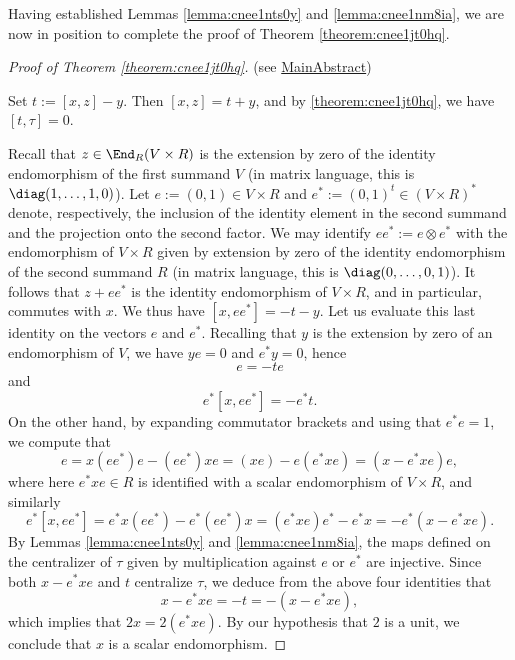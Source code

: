 \documentclass[reqno]{amsart} 
\begin{document}
Having established Lemmas \ref{lemma:cnee1nts0y} and \ref{lemma:cnee1nm8ia}, we are now in position to complete the proof of Theorem \ref{theorem:cnee1jt0hq}.
\begin{proof}[Proof of Theorem \ref{theorem:cnee1jt0hq}]
  (see  \href{MainAbstract.lean}{MainAbstract})
  
  Set $t := [x,z] - y$.  Then $[x,z] = t + y$, and by \ref{theorem:cnee1jt0hq}, we have $[t,\tau] = 0$.

  Recall that $z \in \End_R(V \times R)$ is the extension by zero of the identity endomorphism of the first summand $V$ (in matrix language, this is $\diag(1,\dotsc,1,0)$).  Let $e := (0,1) \in V \times R$ and $e^* := (0,1)^t \in (V \times R)^*$ denote, respectively, the inclusion of the identity element in the second summand and the projection onto the second factor.  We may identify $e e^* := e \otimes e^*$ with the endomorphism of $V \times R$ given by extension by zero of the identity endomorphism of the second summand $R$ (in matrix language, this is $\diag(0,\dotsc,0,1)$).  It follows that $z + e e^*$ is the identity endomorphism of $V \times R$, and in particular, commutes with $x$.  We thus have $[x,e e^*] = - t - y$.  Let us evaluate this last identity on the vectors $e$ and $e^*$.  Recalling that $y$ is the extension by zero of an endomorphism of $V$, we have $y e = 0$ and $e^* y = 0$, hence
  \begin{equation*} [x, ee^*] e = - t e
  \end{equation*}
  and
  \begin{equation*}
    e^* [x, e e^* ] = - e^* t.
  \end{equation*}
  On the other hand, by expanding commutator brackets and using that $e^* e = 1$, we compute that
  \begin{equation*} [x, e e^*] e = x (e e^*) e - (e e^*) x e = (x e) - e (e^* x e) = (x - e^* x e) e,
  \end{equation*}
  where here $e^* x e \in R$ is identified with a scalar endomorphism of $V \times R$, and similarly
  \begin{equation*}
    e^* [x, e e^*] = e^* x (e e^*)  - e^* (e e^*) x = (e^* x e) e^* - e^* x = - e^* (x - e^* x e).
  \end{equation*}
  By Lemmas \ref{lemma:cnee1nts0y} and \ref{lemma:cnee1nm8ia}, the maps defined on the centralizer of $\tau$ given by multiplication against $e$ or $e^*$ are injective.  Since both $x - e^* x e$ and $t$ centralize $\tau$, we deduce from the above four identities that
  \begin{equation*}
    x - e^* x e = - t = - (x - e^* x e),
  \end{equation*}
  which implies that $2 x = 2 (e^* x e)$.  By our hypothesis that $2$ is a unit, we conclude that $x$ is a scalar endomorphism.
\end{proof}
\end{document}
